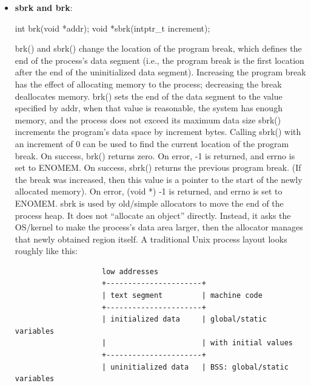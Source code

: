 \documentclass{report}
\begin{document}
        \pagebreak 
        \begin{itemize}
            \item \textbf{sbrk and brk}:
                \begin{cppcode}
                    int brk(void *addr);
                    void *sbrk(intptr_t increment);
                \end{cppcode}
                \bigbreak \noindent 
                brk() and sbrk() change the location of the program break, which defines the end of the process's data segment (i.e., the program break is the first location after the end of the uninitialized data segment).  Increasing the program break has the effect of allocating memory to the process; decreasing the break deallocates memory.
                \bigbreak \noindent 
                brk() sets the end of the data segment to the value specified by addr, when that value is reasonable, the system has enough memory, and the process does not exceed its maximum data size
                \bigbreak \noindent 
                sbrk() increments the program's data space by increment bytes. Calling sbrk() with an increment of 0 can be used to find the current location of the program break.
                \bigbreak \noindent 
                On success, brk() returns zero.  On error, -1 is returned, and errno is set to ENOMEM.
                \bigbreak \noindent 
                On success, sbrk() returns the previous program break.  (If the break was increased, then this value is a pointer to the start of the newly allocated memory).  On error, (void *) -1 is returned, and errno is set to ENOMEM.
                \bigbreak \noindent 
                sbrk is used by old/simple allocators to move the end of the process heap. It does not “allocate an object” directly. Instead, it asks the OS/kernel to make the process’s data area larger, then the allocator manages that newly obtained region itself.
                \bigbreak \noindent 
                A traditional Unix process layout looks roughly like this:
                \begin{verbatim}
                    low addresses
                    +----------------------+
                    | text segment         | machine code
                    +----------------------+
                    | initialized data     | global/static variables 
                    |                      | with initial values
                    +----------------------+
                    | uninitialized data   | BSS: global/static variables 

\end{verbatim}
\end{itemize}
\end{document}
